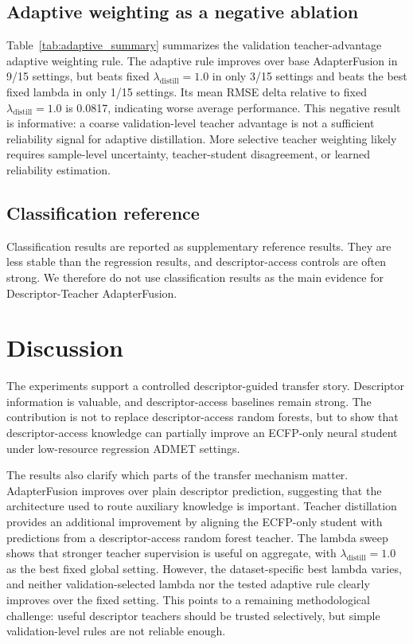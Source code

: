 \documentclass[11pt]{article}
\begin{document}
\subsection{Adaptive weighting as a negative ablation}



Table~\ref{tab:adaptive_summary} summarizes the validation teacher-advantage
adaptive weighting rule. The adaptive rule improves over base AdapterFusion in
9/15 settings, but beats fixed $\lambda_{\mathrm{distill}}=1.0$ in only 3/15
settings and beats the best fixed lambda in only 1/15 settings. Its mean RMSE
delta relative to fixed $\lambda_{\mathrm{distill}}=1.0$ is 0.0817, indicating
worse average performance. This negative result is informative: a coarse
validation-level teacher advantage is not a sufficient reliability signal for
adaptive distillation. More selective teacher weighting likely requires
sample-level uncertainty, teacher-student disagreement, or learned reliability
estimation.

\subsection{Classification reference}

Classification results are reported as supplementary reference results. They
are less stable than the regression results, and descriptor-access controls are
often strong. We therefore do not use classification results as the main
evidence for Descriptor-Teacher AdapterFusion.

\section{Discussion}

The experiments support a controlled descriptor-guided transfer story.
Descriptor information is valuable, and descriptor-access baselines remain
strong. The contribution is not to replace descriptor-access random forests,
but to show that descriptor-access knowledge can partially improve an ECFP-only
neural student under low-resource regression ADMET settings.

The results also clarify which parts of the transfer mechanism matter.
AdapterFusion improves over plain descriptor prediction, suggesting that the
architecture used to route auxiliary knowledge is important. Teacher
distillation provides an additional improvement by aligning the ECFP-only
student with predictions from a descriptor-access random forest teacher. The
lambda sweep shows that stronger teacher supervision is useful on aggregate,
with $\lambda_{\mathrm{distill}}=1.0$ as the best fixed global setting.
However, the dataset-specific best lambda varies, and neither
validation-selected lambda nor the tested adaptive rule clearly improves over
the fixed setting. This points to a remaining methodological challenge: useful
descriptor teachers should be trusted selectively, but simple validation-level
rules are not reliable enough.
\end{document}
